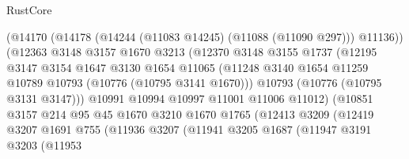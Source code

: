 \begin{lexlean}{RustCore}
\begin{coremodule}
                                (@14170
                                  (@14178 (@14244 (@11083 @14245) (@11088 (@11090 @297))) @11136))
                                (@12363
                                  @3148
                                  @3157
                                  @1670
                                  @3213
                                  (@12370
                                    @3148
                                    @3155
                                    @1737
                                    (@12195
                                      @3147
                                      @3154
                                      @1647
                                      @3130
                                      @1654
                                      @11065
                                      (@11248
                                        @3140
                                        @1654
                                        @11259
                                        @10789
                                        @10793
                                        (@10776 (@10795 @3141 @1670)))
                                      @10793
                                      (@10776 (@10795 @3131 @3147)))
                                    @10991
                                    @10994
                                    @10997
                                    @11001
                                    @11006
                                    @11012)
                                  (@10851
                                    @3157
                                    @214
                                    @95
                                    @45
                                    @1670
                                    @3210
                                    @1670
                                    @1765
                                    (@12413
                                      @3209
                                      (@12419
                                        @3207
                                        @1691
                                        @755
                                        (@11936
                                          @3207
                                          (@11941
                                            @3205
                                            @1687
                                            (@11947
                                              @3191
                                              @3203
                                              (@11953

\end{coremodule}
\end{lexlean}
